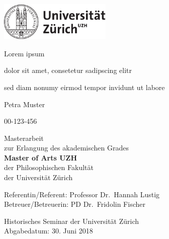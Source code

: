 \documentclass[12pt,de-CH,twoside,openright]{report}
\begin{document}

\begin{titlepage}
    \begin{center}

      \includegraphics[width=0.4\textwidth]{template/uzh_logo_d_pos.pdf}

        \vspace*{2.5cm}

        \huge
        {Lorem ipsum}

        \vspace{0.5cm}

        \large
        {dolor sit amet, consetetur sadipscing elitr

sed diam nonumy eirmod tempor invidunt ut labore}

        \vspace{1.5cm}

        \Large
        {Petra Muster}

        \normalsize
        {00-123-456}

        \vspace{1.5cm}

        \normalsize
        Masterarbeit\\
        zur Erlangung des akademischen Grades\\
        \textbf{Master of Arts UZH}\\
        der Philosophischen Fakultät\\
        der Universität Zürich

        \vfill

        \normalsize
        Referentin/Referent: {Professor Dr.~Hannah Lustig}\\
        Betreuer/Betreuerin: {PD Dr.~Fridolin Fischer}\\

        \vspace{0.8cm}

        \normalsize
        {Historisches Seminar der Universität Zürich}\\
        Abgabedatum: {30. Juni 2018}

    \end{center}
\end{titlepage}
\end{document}
